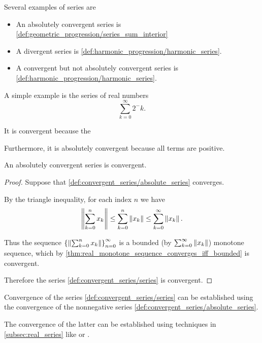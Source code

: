 \begin{example}\label{ex:series}
  Several examples of series are
  \begin{itemize}
    \item An absolutely convergent series is \cref{def:geometric_progression/series_sum_interior}
    \item A divergent series is \cref{def:harmonic_progression/harmonic_series}.
    \item A convergent but not absolutely convergent series is \cref{def:harmonic_progression/harmonic_series}.
  \end{itemize}
\end{example}

\begin{example}\label{ex:series_of_reciprocal_powers_of_two}
  A simple example is the series of real numbers
  \begin{equation*}
    \sum_{k=0}^\infty {2^-k}.
  \end{equation*}

  It is convergent because the

  Furthermore, it is absolutely convergent because all terms are positive.
\end{example}

\begin{proposition}\label{thm:absolutely_convergent_series_is_convergent}
  An absolutely convergent series is convergent.
\end{proposition}
\begin{proof}
  Suppose that \cref{def:convergent_series/absolute_series} converges.

  By the triangle inequality, for each index \( n \) we have
  \begin{equation*}
    \left\Vert \sum_{k=0}^n x_k \right\Vert \leq \sum_{k=0}^n \left\Vert x_k \right\Vert \leq \sum_{k=0}^\infty \left\Vert x_k \right\Vert.
  \end{equation*}

  Thus the sequence \( \left\{ \left\Vert \sum_{k=0}^{n} x_k \right\Vert \right\}_{n=0}^\infty \) is a bounded (by \( \sum_{k=0}^\infty \left\Vert x_k \right\Vert \)) monotone sequence, which by \cref{thm:real_monotone_sequence_converges_iff_bounded} is convergent.

  Therefore the series \cref{def:convergent_series/series} is convergent.
\end{proof}

\begin{remark}\label{remark:establish_series_convergence_by_absolute_series}
  Convergence of the series \cref{def:convergent_series/series} can be established using the convergence of the nonnegative series \cref{def:convergent_series/absolute_series}.

  The convergence of the latter can be established using techniques in \cref{subsec:real_series} like  or .
\end{remark}

